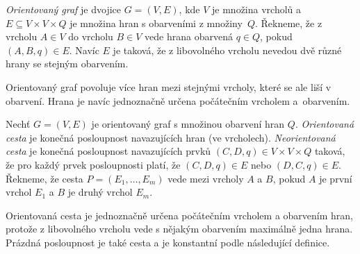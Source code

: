 \begin{definice}
    \emph{Orientovaný graf} je dvojice $G = (V,E)$, kde $V$ je množina vrcholů a $E \subseteq V\times V \times Q$ je množina hran s obarveními z množiny~$Q$. 
    Řekneme, že z vrcholu $A \in V$ do vrcholu $B \in V$ vede hrana obarvená $q \in Q$, pokud $(A,B,q) \in E$. Navíc $E$ je taková, že z libovolného vrcholu nevedou dvě různé hrany se stejným obarvením.
\end{definice}
\begin{pozn}
    Orientovaný graf povoluje více hran mezi stejnými vrcholy, které se ale liší v obarvení. Hrana je navíc jednoznačně určena počátečním vrcholem a~obarvením.
\end{pozn}
\begin{definice}
    Nechť $G = (V, E)$ je orientovaný graf s množinou obarvení hran $Q$.
    \emph{Orientovaná cesta} je konečná posloupnost navazujících hran (ve vrcholech).
    \emph{Neorientovaná cesta} je konečná posloupnost navazujících prvků $(C,D,q) \in V \times V \times Q$ taková, že pro každý prvek posloupnosti platí, že $(C,D,q) \in E$ nebo $(D,C,q) \in E$. Řekneme, že cesta $P = (E_1, \dots, E_m)$ vede mezi vrcholy $A$ a $B$, pokud $A$ je první vrchol $E_1$ a $B$ je druhý vrchol $E_m$. 
\end{definice}
\begin{pozn}
    Orientovaná cesta je jednoznačně určena počátečním vrcholem a obarvením hran, protože z libovolného vrcholu vede s nějakým obarvením maximálně jedna hrana.
    Prázdná posloupnost je také cesta a je konstantní podle následující definice. 
\end{pozn}

